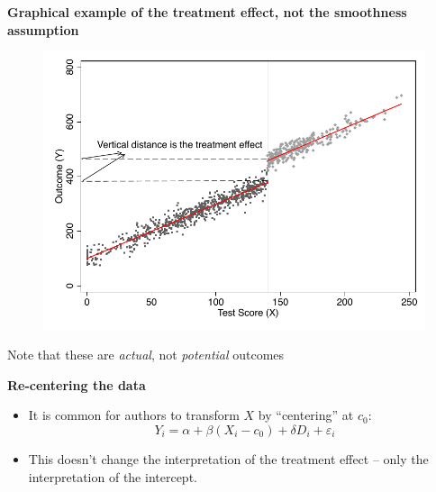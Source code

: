 \documentclass[notes=show]{beamer}
\begin{document}
\begin{frame}[plain]
\begin{center}
\textbf{Graphical example of the treatment effect, not the smoothness assumption}
\end{center}

\begin{figure}
\includegraphics[scale=0.6]{./lecture_includes/linear_ex.pdf}
\end{figure}
Note that these are \emph{actual}, not \emph{potential} outcomes
\end{frame}


\begin{frame}[plain]

	\begin{center}
	\textbf{Re-centering the data}
	\end{center}
	
	\begin{itemize}
	\item It is common for authors to transform $X$ by ``centering'' at $c_0$:$$Y_i=\alpha + \beta(X_i-c_0) + \delta D_i +\varepsilon_i$$
	\item This doesn't change the interpretation of the treatment effect -- only the interpretation of the intercept.
	\end{itemize}

\end{frame}
\end{document}
